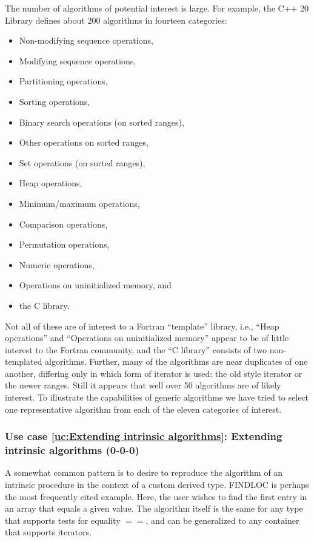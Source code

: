 \documentclass{article}
\newcounter{usecase}
\newcommand{\newusecase}[2]{
\refstepcounter{usecase}\label{uc:#1}
\subsubsection{Use case \ref{uc:#1}: #1 (#2)}}
\begin{document}
The number of algorithms of potential interest is large.
For example, the C++ 20 Library defines about 200
algorithms in fourteen categories:
\begin{itemize}
\item Non-modifying sequence operations,
\item Modifying sequence operations,
\item Partitioning operations,
\item Sorting operations,
\item Binary search operations (on sorted ranges),
\item Other operations on sorted ranges,
\item Set operations (on sorted ranges),
\item Heap operations,
\item Minimum/maximum operations,
\item Comparison operations,
\item Permutation operations,
\item Numeric operations,
\item Operations on uninitialized memory, and
\item the C library.
\end{itemize}
Not all of these are of interest to a Fortran ``template'' library, i.e.,
``Heap operations'' and ``Operations on uninitialized  memory'' appear
to be of little interest to the Fortran community, and the ``C library''
consists of two non-templated algorithms. Further, many of the
algorithms are near duplicates of one another, differing only in
which form of iterator is used: the old style iterator or the newer
ranges. Still it appears that
well over 50 algorithms are of likely interest. To illustrate the
capabilities of generic algorithms we have tried to select one
representative algorithm from each of the eleven categories of
interest. 

\newusecase{Extending intrinsic algorithms}{0-0-0}
A somewhat common pattern is to desire to reproduce the algorithm of
an intrinsic procedure in the context of a custom derived type.
{\rm FINDLOC} is perhaps the most frequently cited example.  Here, the
user wishes to find the first entry in an array that equals a given
value.  The algorithm itself is the same for any type that 
supports tests for equality $==$, and can be generalized to any
container that supports iterators.
\end{document}
